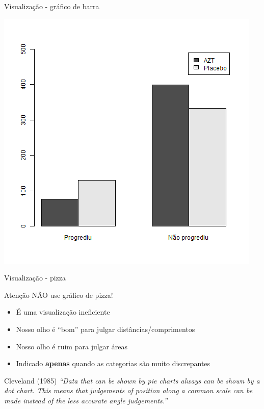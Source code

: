 \documentclass{beamer}
\begin{document}
\begin{frame}{Visualização - gráfico de barra}
  \begin{center}
    \includegraphics[height=\textheight]{Cap26-27/barplot}
  \end{center}
\end{frame}

\begin{frame}{Visualização - pizza}
  \begin{block}{Atenção}
    NÃO use gráfico de pizza!
  \end{block}
  \begin{itemize}
  \item É uma visualização ineficiente
  \item Nosso olho é ``bom'' para julgar distâncias/comprimentos
  \item Nosso olho é ruim para julgar áreas
  \item Indicado {\bf apenas} quando as categorias são muito discrepantes
  \end{itemize}
  \begin{block}{Cleveland (1985)}
    {\em ``Data that can be shown by pie charts always can be shown by a dot chart.
      This means that judgements of position along a common scale can be made instead of the less accurate angle judgements.''}
  \end{block}
\end{frame}
\end{document}
